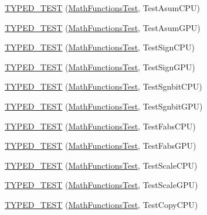 \begin{DoxyCompactItemize}
\item 
\hyperlink{namespacecaffe_ab58c8756a63714960e749cab73b8df31}{T\+Y\+P\+E\+D\+\_\+\+T\+E\+S\+T} (\hyperlink{classcaffe_1_1_math_functions_test}{Math\+Functions\+Test}, Test\+Asum\+C\+P\+U)
\item 
\hyperlink{namespacecaffe_af2f18adb327fb6d3cf2d9e4fc4bd7e48}{T\+Y\+P\+E\+D\+\_\+\+T\+E\+S\+T} (\hyperlink{classcaffe_1_1_math_functions_test}{Math\+Functions\+Test}, Test\+Asum\+G\+P\+U)
\item 
\hyperlink{namespacecaffe_acd5cd826c9813c195c9323bf39752752}{T\+Y\+P\+E\+D\+\_\+\+T\+E\+S\+T} (\hyperlink{classcaffe_1_1_math_functions_test}{Math\+Functions\+Test}, Test\+Sign\+C\+P\+U)
\item 
\hyperlink{namespacecaffe_ac8123f50b3285f11e481d55094858c1d}{T\+Y\+P\+E\+D\+\_\+\+T\+E\+S\+T} (\hyperlink{classcaffe_1_1_math_functions_test}{Math\+Functions\+Test}, Test\+Sign\+G\+P\+U)
\item 
\hyperlink{namespacecaffe_a83bcf6321619bd9b734caeebf8f83af5}{T\+Y\+P\+E\+D\+\_\+\+T\+E\+S\+T} (\hyperlink{classcaffe_1_1_math_functions_test}{Math\+Functions\+Test}, Test\+Sgnbit\+C\+P\+U)
\item 
\hyperlink{namespacecaffe_a928dec1dc07d9b3b1570580cb4aded0d}{T\+Y\+P\+E\+D\+\_\+\+T\+E\+S\+T} (\hyperlink{classcaffe_1_1_math_functions_test}{Math\+Functions\+Test}, Test\+Sgnbit\+G\+P\+U)
\item 
\hyperlink{namespacecaffe_a2f273d627edceadd9bb5dc253a585d12}{T\+Y\+P\+E\+D\+\_\+\+T\+E\+S\+T} (\hyperlink{classcaffe_1_1_math_functions_test}{Math\+Functions\+Test}, Test\+Fabs\+C\+P\+U)
\item 
\hyperlink{namespacecaffe_a440672cb707755dc364904b809b45d32}{T\+Y\+P\+E\+D\+\_\+\+T\+E\+S\+T} (\hyperlink{classcaffe_1_1_math_functions_test}{Math\+Functions\+Test}, Test\+Fabs\+G\+P\+U)
\item 
\hyperlink{namespacecaffe_ac2424b3b6b4ef2aec3eff4465ffc36a5}{T\+Y\+P\+E\+D\+\_\+\+T\+E\+S\+T} (\hyperlink{classcaffe_1_1_math_functions_test}{Math\+Functions\+Test}, Test\+Scale\+C\+P\+U)
\item 
\hyperlink{namespacecaffe_aee06c7db146b7c765689ad500da87b11}{T\+Y\+P\+E\+D\+\_\+\+T\+E\+S\+T} (\hyperlink{classcaffe_1_1_math_functions_test}{Math\+Functions\+Test}, Test\+Scale\+G\+P\+U)
\item 
\hyperlink{namespacecaffe_a45a9bf5b8098ba00f4049dd22717d29b}{T\+Y\+P\+E\+D\+\_\+\+T\+E\+S\+T} (\hyperlink{classcaffe_1_1_math_functions_test}{Math\+Functions\+Test}, Test\+Copy\+C\+P\+U)
\item 

\end{DoxyCompactItemize}
